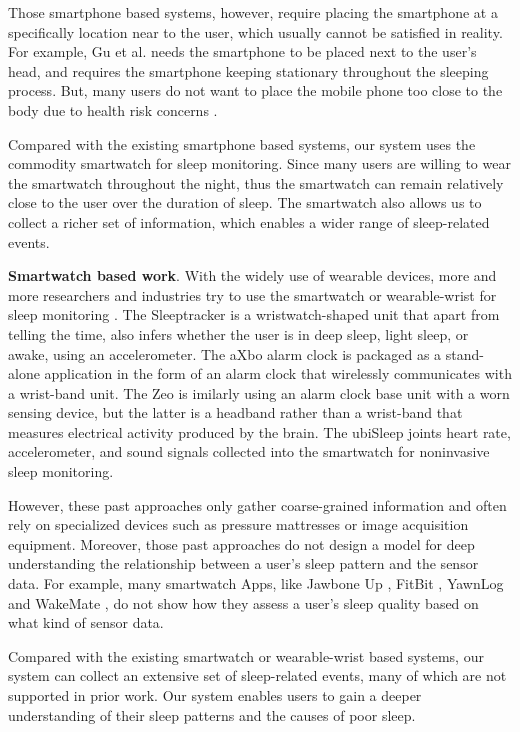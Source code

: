 Those smartphone based systems, however, require placing the smartphone at a specifically location near to the user, which usually cannot be satisfied in reality. For example, Gu et al. \cite{gu2016sleep} needs the smartphone to be placed next to the user's head, and requires the smartphone keeping stationary throughout the sleeping process. But, many users do not want to place the mobile phone too close to the body due to health risk concerns  \cite{StepHealth,Quorasleep}.

Compared with the existing smartphone based systems, our system uses the commodity smartwatch for sleep monitoring. Since many users are willing to wear the smartwatch throughout the night, thus the smartwatch can remain relatively close to the user over the duration of sleep. The smartwatch also allows us to collect a richer set of information, which enables a wider range of sleep-related events.


\textbf{Smartwatch based work}. With the widely use of wearable devices, more and more researchers and industries try to  use the smartwatch or wearable-wrist for sleep monitoring \cite{bain2003evaluation,bonnet2003insomnia,pombo2016ubisleep,caviness1996myoclonus}.  The Sleeptracker \cite{bain2003evaluation} is a wristwatch-shaped unit that apart from telling the time, also infers whether the user is in deep sleep, light sleep, or awake, using an accelerometer. The aXbo alarm clock \cite{bonnet2003insomnia} is packaged as a stand-alone application in the form of an alarm clock that wirelessly communicates with a wrist-band unit. The Zeo \cite{caviness1996myoclonus} is  imilarly using an alarm clock base unit with a worn sensing device, but the latter is a headband rather than a wrist-band that measures electrical activity produced by the brain. The ubiSleep \cite{pombo2016ubisleep} joints  heart rate,  accelerometer,  and  sound  signals  collected  into  the smartwatch for  noninvasive sleep monitoring.

However, these past approaches only gather coarse-grained information and often rely on specialized devices such as pressure mattresses or image acquisition equipment. Moreover, those past approaches do not design a model for deep understanding the relationship between a user's sleep pattern and the sensor data. For example, many smartwatch Apps, like Jawbone Up \cite{Jawbone}, FitBit \cite{fitbit}, YawnLog \cite{YawnLog} and WakeMate \cite{WakeMate}, do not show how they assess a user's sleep quality based on what kind of sensor data.

Compared with the existing smartwatch or wearable-wrist based systems, our system can collect an extensive set of sleep-related events, many of which are not supported in prior work. Our system enables users to gain a deeper understanding of their sleep patterns and the causes of poor sleep. 